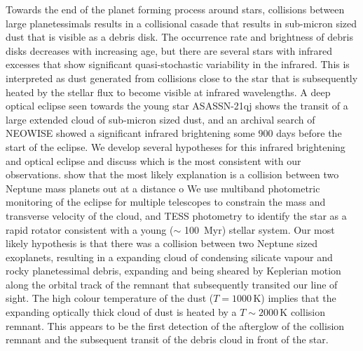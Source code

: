 \documentclass{aa}
\newcommand{\asas}{ASASSN-21qj}
\begin{document}
  \abstract
   {Towards the end of the planet forming process around stars, collisions between large planetessimals results in a collisional casade that results in sub-micron sized dust that is visible as a debris disk. 
   The occurrence rate and brightness of debris disks decreases with increasing age, but there are several stars with infrared excesses that show significant quasi-stochastic variability in the infrared.
   This is interpreted as dust generated from collisions close to the star that is subsequently heated by the stellar flux to become visible at infrared wavelengths.}
   {A deep optical eclipse seen towards the young star \asas{} shows the transit of a large extended cloud of sub-micron sized dust, and an archival search of NEOWISE showed a significant infrared brightening some 900 days before the start of the eclipse.
   We develop several hypotheses for this infrared brightening and optical eclipse and discuss which is the most consistent with our observations.
   show that the most likely explanation is a collision between two Neptune mass planets out at a distance o}
   {We use multiband photometric monitoring of the eclipse for multiple telescopes to constrain the mass and transverse velocity of the cloud, and TESS photometry to identify the star as a rapid rotator consistent with a young ($\sim$ 100~Myr) stellar system.}
   {Our most likely hypothesis is that there was a collision between two Neptune sized exoplanets, resulting in a expanding cloud of condensing silicate vapour and rocky planetessimal debris, expanding and being sheared by Keplerian motion along the orbital track of the remnant that subsequently transited our line of sight.
   The high colour temperature of the dust ($T=1000$\,K) implies that the expanding optically thick cloud of dust is heated by a $T\sim 2000$\,K collision remnant.
   This appears to be the first detection of the afterglow of the collision remnant and the subsequent transit of the debris cloud in front of the star.
   }
   {}


   \maketitle
%
\end{document}
